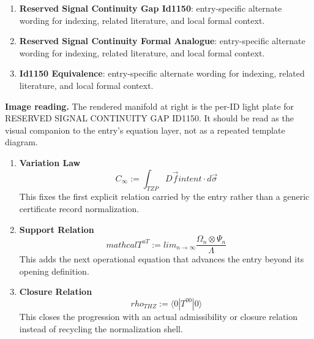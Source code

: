 \begin{enumerate}[leftmargin=1.6em,itemsep=6pt,topsep=4pt]
\item \textbf{Reserved Signal Continuity Gap Id1150}: entry-specific alternate wording for indexing, related literature, and local formal context.
\item \textbf{Reserved Signal Continuity Formal Analogue}: entry-specific alternate wording for indexing, related literature, and local formal context.
\item \textbf{Id1150 Equivalence}: entry-specific alternate wording for indexing, related literature, and local formal context.
\end{enumerate}

\begin{samepage}
\noindent\begin{minipage}[t]{0.45\linewidth}
\vspace{0pt}
\raggedright
\scriptsize\textbf{Image reading.} The rendered manifold at right is the per-ID light plate for RESERVED SIGNAL CONTINUITY GAP ID1150. It should be read as the visual companion to the entry's equation layer, not as a repeated template diagram.\par
\end{minipage}\hfill
\begin{minipage}[t]{0.53\linewidth}
\vspace*{-0.10in}
\raggedright
{}
\end{minipage}
\end{samepage}

\clearpage


\begin{enumerate}[leftmargin=1.6em,itemsep=9pt,topsep=6pt]
\item \textbf{Variation Law}
\[
C_{\infty} := \int_{TZP} D \vec{f} {intent} \cdot d\vec{\sigma}
\]
This fixes the first explicit relation carried by the entry rather than a generic certificate record normalization.

\item \textbf{Support Relation}
\[
mathcal{T}^{uT}:=lim_{n\rightarrow\infty}\frac{\Omega_{n}\otimes\Psi_{n}}{\Lambda}
\]
This adds the next operational equation that advances the entry beyond its opening definition.

\item \textbf{Closure Relation}
\[
rho_{THZ}:=\langle0|T^{00}|0\rangle
\]
This closes the progression with an actual admissibility or closure relation instead of recycling the normalization shell.
\end{enumerate}

